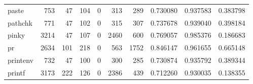 \begin{longtable}{lrrrrrrrrr}
paste     &                                                753 &                                                 47 &                                                104 &                                                  0 &                                                313 &                                                289 &                                           0.730080 &                               0.937583 &                             0.383798 \\
pathchk   &                                                771 &                                                 47 &                                                102 &                                                  0 &                                                315 &                                                307 &                                           0.737678 &                               0.939040 &                             0.398184 \\
pinky     &                                               3214 &                                                 47 &                                                107 &                                                  0 &                                               2460 &                                                600 &                                           0.769057 &                               0.985376 &                             0.186683 \\
pr        &                                               2634 &                                                101 &                                                218 &                                                  0 &                                                563 &                                               1752 &                                           0.846147 &                               0.961655 &                             0.665148 \\
printenv  &                                                732 &                                                 47 &                                                100 &                                                  0 &                                                300 &                                                285 &                                           0.730874 &                               0.935792 &                             0.389344 \\
printf    &                                               3173 &                                                222 &                                                126 &                                                  0 &                                               2386 &                                                439 &                                           0.712260 &                               0.930035 &                             0.138355 \\

\end{longtable}
